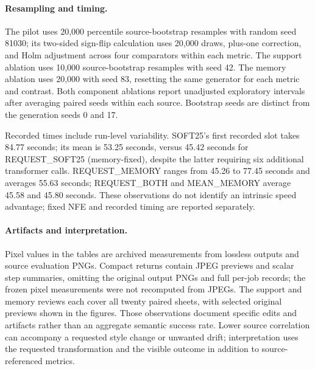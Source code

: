 \paragraph{Resampling and timing.}
The pilot uses 20,000 percentile source-bootstrap resamples with random seed 81030; its two-sided sign-flip calculation uses 20,000 draws, plus-one correction, and Holm adjustment across four comparators within each metric. The support ablation uses 10,000 source-bootstrap resamples with seed 42. The memory ablation uses 20,000 with seed 83, resetting the same generator for each metric and contrast. Both component ablations report unadjusted exploratory intervals after averaging paired seeds within each source. Bootstrap seeds are distinct from the generation seeds 0 and 17.

Recorded times include run-level variability. SOFT25's first recorded slot takes 84.77 seconds; its mean is 53.25 seconds, versus 45.42 seconds for REQUEST\_SOFT25 (memory-fixed), despite the latter requiring six additional transformer calls. REQUEST\_MEMORY ranges from 45.26 to 77.45 seconds and averages 55.63 seconds; REQUEST\_BOTH and MEAN\_MEMORY average 45.58 and 45.80 seconds. These observations do not identify an intrinsic speed advantage; fixed NFE and recorded timing are reported separately.

\paragraph{Artifacts and interpretation.}
Pixel values in the tables are archived measurements from lossless outputs and source evaluation PNGs. Compact returns contain JPEG previews and scalar step summaries, omitting the original output PNGs and full per-job records; the frozen pixel measurements were not recomputed from JPEGs. The support and memory reviews each cover all twenty paired sheets, with selected original previews shown in the figures. Those observations document specific edits and artifacts rather than an aggregate semantic success rate. Lower source correlation can accompany a requested style change or unwanted drift; interpretation uses the requested transformation and the visible outcome in addition to source-referenced metrics.

